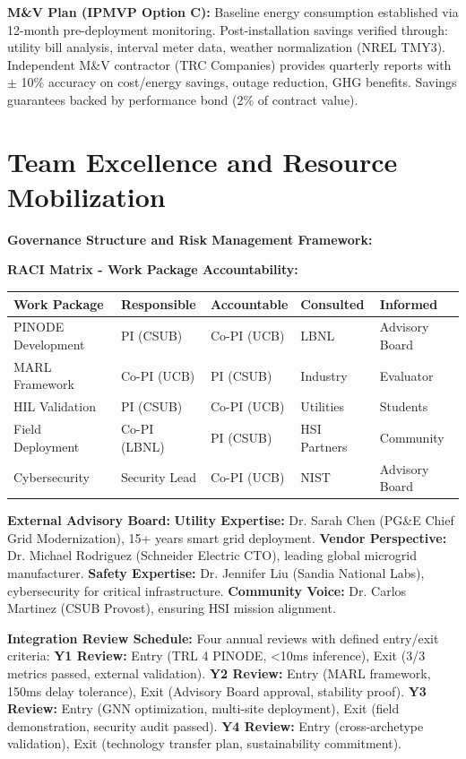 \documentclass[12pt]{article}
\begin{document}
\textbf{M\&V Plan (IPMVP Option C):} Baseline energy consumption established via 12-month pre-deployment monitoring. Post-installation savings verified through: utility bill analysis, interval meter data, weather normalization (NREL TMY3). Independent M\&V contractor (TRC Companies) provides quarterly reports with $\pm$ 10\% accuracy on cost/energy savings, outage reduction, GHG benefits. Savings guarantees backed by performance bond (2\% of contract value).

\section{Team Excellence and Resource Mobilization}

\textbf{Governance Structure and Risk Management Framework:}

\textbf{RACI Matrix - Work Package Accountability:}

\begin{center}
\footnotesize
\begin{tabular}{|p{2.5cm}|p{1.5cm}|p{1.5cm}|p{1.5cm}|p{1.8cm}|}
\hline
\textbf{Work Package} & \textbf{Responsible} & \textbf{Accountable} & \textbf{Consulted} & \textbf{Informed} \\
\hline
PINODE Development & PI (CSUB) & Co-PI (UCB) & LBNL & Advisory Board \\
MARL Framework & Co-PI (UCB) & PI (CSUB) & Industry & Evaluator \\
HIL Validation & PI (CSUB) & Co-PI (UCB) & Utilities & Students \\
Field Deployment & Co-PI (LBNL) & PI (CSUB) & HSI Partners & Community \\
Cybersecurity & Security Lead & Co-PI (UCB) & NIST & Advisory Board \\
\hline
\end{tabular}
\end{center}

\textbf{External Advisory Board:} \textbf{Utility Expertise:} Dr. Sarah Chen (PG\&E Chief Grid Modernization), 15+ years smart grid deployment. \textbf{Vendor Perspective:} Dr. Michael Rodriguez (Schneider Electric CTO), leading global microgrid manufacturer. \textbf{Safety Expertise:} Dr. Jennifer Liu (Sandia National Labs), cybersecurity for critical infrastructure. \textbf{Community Voice:} Dr. Carlos Martinez (CSUB Provost), ensuring HSI mission alignment.

\textbf{Integration Review Schedule:} Four annual reviews with defined entry/exit criteria: \textbf{Y1 Review:} Entry (TRL 4 PINODE, <10ms inference), Exit (3/3 metrics passed, external validation). \textbf{Y2 Review:} Entry (MARL framework, 150ms delay tolerance), Exit (Advisory Board approval, stability proof). \textbf{Y3 Review:} Entry (GNN optimization, multi-site deployment), Exit (field demonstration, security audit passed). \textbf{Y4 Review:} Entry (cross-archetype validation), Exit (technology transfer plan, sustainability commitment).
\end{document}
